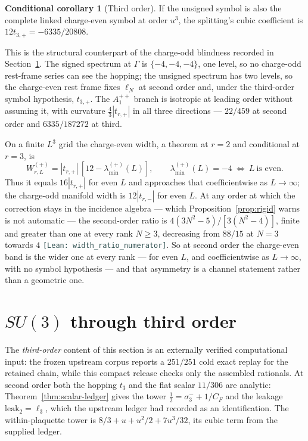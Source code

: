 \documentclass[11pt]{article}
\theoremstyle{plain}
\theoremstyle{definition}
\newtheorem{conditional}[theorem]{Conditional corollary}
\theoremstyle{remark}
\newcommand{\chk}[1]{}
\newcommand{\leanref}[1]{{\footnotesize\textcolor{DarkSlateGray}{\texttt{[Lean: #1]}}}}
\newcommand{\CF}{C_F}
\begin{document}
\begin{conditional}[Third order]\label{prop:evengamma3}
If the unsigned symbol is also the complete linked charge-even symbol at order
$u^3$, the splitting's cubic coefficient is $12t_{3,+}=-6335/20808$.
\end{conditional}
\chk{the C-even Gamma point pins t\_+, exactly where no C-odd Gamma datum can}

This is the structural counterpart of the charge-odd blindness recorded in
Section~\ref{sec:su3}. The signed spectrum at $\Gamma$ is $\{-4,-4,-4\}$, one
level, so no charge-odd rest-frame series can see the hopping; the unsigned
spectrum has two levels, so the charge-even rest frame fixes $\ell_N$ at
second order and, under the third-order symbol hypothesis, $t_{3,+}$. The
$A_1^{++}$
branch is isotropic at leading order without assuming it, with curvature
$\tfrac43|t_{r,+}|$ in all three directions --- $22/459$ at second order and
$6335/187272$ at third.
\chk{the C-even curvature is (4/3)|t\_+| at both orders, and isotropic}

On a finite $L^3$ grid the charge-even width, a theorem at $r=2$ and
conditional at $r=3$, is
\[
 W^{(+)}_{r,L}=|t_{r,+}|\,[12-\lambda_{\min}^{(+)}(L)],
 \qquad \lambda_{\min}^{(+)}(L)=-4\ \Longleftrightarrow\ L\ \text{is even}.
\]
Thus it equals $16|t_{r,+}|$ for even $L$ and approaches that coefficientwise
as $L\to\infty$; the charge-odd manifold width is $12|t_{r,-}|$ for even $L$.
At any order at which the correction
stays in the incidence algebra --- which Proposition~\ref{prop:rigid} warns is
not automatic --- the second-order ratio is $4(3N^2-5)/[3(N^2-4)]$, finite and
greater than one at every rank $N\ge3$, decreasing from $88/15$ at $N=3$
towards $4$ \leanref{width\_ratio\_numerator}. So at second order the
charge-even band is the wider one at every rank --- for even $L$, and
coefficientwise as $L\to\infty$, with no symbol hypothesis --- and that
asymmetry is a channel statement rather than a geometric one.
\chk{the C-even bandwidth is 16|t\_+| at every order; the C-odd manifold width is 12|t\_-|}
\chk{at N = 2 the C-odd hopping vanishes and the C-even one does not}

\section{\texorpdfstring{$SU(3)$}{SU(3)} through third order}
\label{sec:su3}

The \emph{third-order} content of this section is an externally verified
computational input: the frozen upstream corpus reports a $251/251$ cold exact
replay for the retained chain, while this compact release checks only the
assembled rationals. At second order both the hopping $t_3$ and the flat
scalar $11/306$ are analytic: Theorem~\ref{thm:scalar-ledger} gives the tower
$\tfrac12=\sigma^-_3+1/\CF$ and the leakage $\mathrm{leak}_2=\ell_3$, which the
upstream ledger had recorded as an identification. The within-plaquette tower
is $8/3+u+u^2/2+7u^3/32$, its cubic term from the supplied ledger.
\end{document}
